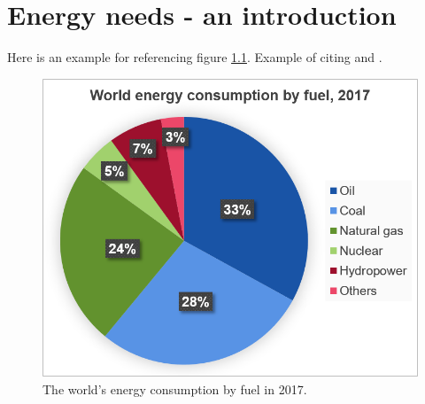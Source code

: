 \documentclass[electronic]{kthesis}
\begin{document}
\chapter{Energy needs - an introduction}
\label{Intro}
Here is an example for referencing figure \ref{EnergySources}. Example of citing \cite{BP2019} and \cite{Chen2016}.
\begin{figure}[h]
	\centering
	\includegraphics[scale=0.6]{Figs/Ch1_EnergySources.png}
	\caption{The world's energy consumption by fuel in 2017. }
	\label{EnergySources}
\end{figure}

\end{document}
